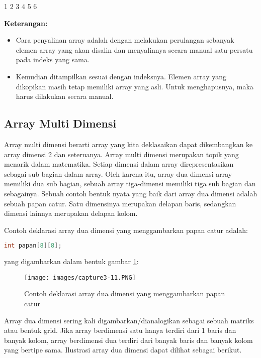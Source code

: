 \begin{lcverbatim}
1
2
3
4
5
6
\end{lcverbatim}

\textbf{Keterangan:}

\begin{itemize}

\item
  Cara penyalinan array adalah dengan melakukan perulangan sebanyak
  elemen array yang akan disalin dan menyalinnya secara manual
  satu-persatu pada indeks yang sama.
\item
  Kemudian ditampilkan sesuai dengan indeksnya. Elemen array yang
  dikopikan masih tetap memiliki array yang asli. Untuk menghapusnya,
  maka harus dilakukan secara manual.
\end{itemize}

\subsection{Array Multi Dimensi}\label{array-multi-dimensi}

Array multi dimensi berarti array yang kita deklasaikan dapat
dikembangkan ke array dimensi 2 dan seteruanya. Array multi dimensi
merupakan topik yang menarik dalam matematika. Setiap dimensi dalam
array direpresentasikan sebagai sub bagian dalam array. Oleh karena itu,
array dua dimensi array memiliki dua sub bagian, sebuah array
tiga-dimensi memiliki tiga sub bagian dan sebagainya. Sebuah contoh
bentuk nyata yang baik dari array dua dimensi adalah sebuah papan catur.
Satu dimensinya merupakan delapan baris, sedangkan dimensi lainnya
merupakan delapan kolom.

Contoh deklarasi array dua dimensi yang menggambarkan papan catur
adalah:

\begin{lstlisting}[language=c++, numbers=none]
int papan[8][8];
\end{lstlisting}

yang digambarkan dalam bentuk gambar \ref{gambar3-2}:

\begin{figure}[htbp]
\centering
\texttt{[image: images/capture3-11.PNG]}
\label{gambar3-2}
\caption{Contoh deklarasi array dua dimensi yang menggambarkan papan catur}
\end{figure}

Array dua dimensi sering kali digambarkan/dianalogikan sebagai sebuah
matriks atau bentuk grid. Jika array berdimensi satu hanya terdiri dari
1 baris dan banyak kolom, array berdimensi dua terdiri dari banyak baris
dan banyak kolom yang bertipe sama. Ilustrasi array dua dimensi dapat
dilihat sebagai berikut.

